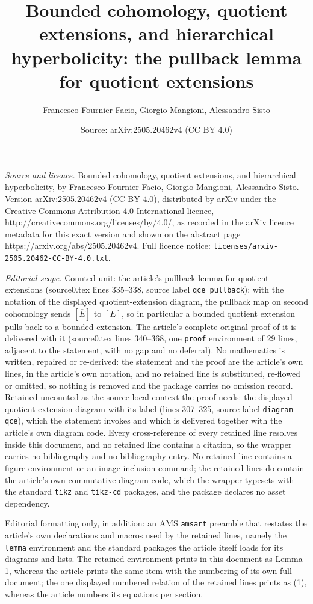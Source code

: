 \documentclass[10pt,a4paper]{amsart}
\title[pullback lemma]{Bounded cohomology, quotient extensions, and hierarchical hyperbolicity: the pullback lemma for quotient extensions}
\author{Francesco Fournier-Facio, Giorgio Mangioni, Alessandro Sisto}
\date{Source: arXiv:2505.20462v4 (CC BY 4.0)}
\begin{document}
\maketitle

\noindent\emph{Source and licence.} Bounded cohomology, quotient extensions, and hierarchical hyperbolicity, by Francesco Fournier-Facio, Giorgio Mangioni, Alessandro Sisto. Version arXiv:2505.20462v4
(CC BY 4.0), distributed by arXiv under the Creative Commons Attribution 4.0 International licence,
http://creativecommons.org/licenses/by/4.0/, as recorded in the arXiv licence metadata for this exact
version and shown on the abstract page https://arxiv.org/abs/2505.20462v4. Full licence notice:
\texttt{licenses/arxiv-2505.20462-CC-BY-4.0.txt}.\par\smallskip

\noindent\textit{Editorial scope.} Counted unit: the article's pullback lemma for quotient extensions (source0.tex lines 335--338, source label \texttt{qce pullback}): with the notation of the displayed quotient-extension diagram, the pullback map on second cohomology sends $[\overline{E}]$ to $[E]$, so in particular a bounded quotient extension pulls back to a bounded extension. The article's complete original proof of it is delivered with it (source0.tex lines 340--368, one \texttt{proof} environment of 29 lines, adjacent to the statement, with no gap and no deferral). No mathematics is written, repaired or re-derived: the statement and the proof are the article's own lines, in the article's own notation, and no retained line is substituted, re-flowed or omitted, so nothing is removed and the package carries no omission record. Retained uncounted as the source-local context the proof needs: the displayed quotient-extension diagram with its label (lines 307--325, source label \texttt{diagram qce}), which the statement invokes and which is delivered together with the article's own diagram code. Every cross-reference of every retained line resolves inside this document, and no retained line contains a citation, so the wrapper carries no bibliography and no bibliography entry. No retained line contains a figure environment or an image-inclusion command; the retained lines do contain the article's own commutative-diagram code, which the wrapper typesets with the standard \texttt{tikz} and \texttt{tikz-cd} packages, and the package declares no asset dependency.

Editorial formatting only, in addition: an AMS \texttt{amsart} preamble that restates the article's own declarations and macros used by the retained lines, namely the \texttt{lemma} environment and the standard packages the article itself loads for its diagrams and lists. The retained environment prints in this document as Lemma 1, whereas the article prints the same item with the numbering of its own full document; the one displayed numbered relation of the retained lines prints as (1), whereas the article numbers its equations per section.
\end{document}
